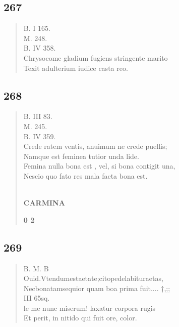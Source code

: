 \documentclass[11pt, a4paper]{report}
\begin{document}
            \subsection*{267}
      \begin{verse}
      B. I 165. \\ M. 248. \\ B. IV 358. \\ Chrysocome gladium fugiens stringente marito \\ Texit adulterium iudice casta reo. \\ 
      \end{verse}
  
            \subsection*{268}
      \begin{verse}
      B. III 83. \\ M. 245. \\ B. IV 359. \\ Crede ratem ventis, anuimum ne crede puellis; \\ Namque est feminea tutior unda lide. \\ Femina nulla bona  \lbrack est \rbrack , vel, si bona contigit una, \\ Nescio quo fato res mala facta bona est. \\ 
        ﻿\pagebreak 
    \begin{center} \textbf{CARMINA} \end{center}\begin{center} \textbf{0 2} \end{center}
      \end{verse}
  
            \subsection*{269}
      \begin{verse}
      B. M. B \\ Ouid.Vtendumestaetate;citopedelabituraetas, \\ Necbonatamsequior quam boa prima fuit.... †,;; \\ III 65sq. \\ le me nunc miserum! laxatur corpora rugis \\ Et perit, in nitido qui fuit ore, color. \\ 
      \end{verse}
  
\end{document}

